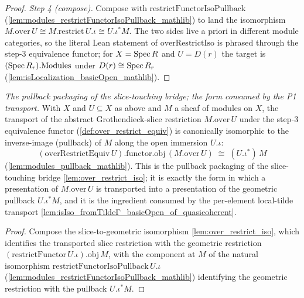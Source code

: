 \begin{proof}
  \emph{Step 4 (compose).} Compose with
  \(\mathrm{restrictFunctorIsoPullback}\) (\cref{lem:modules_restrictFunctorIsoPullback_mathlib})
  to land the isomorphism \(M.\mathrm{over}\,U \cong M.\mathrm{restrict}\,U.\iota \cong
  U.\iota^{*}M\). The two sides live a priori in different module categories, so the literal Lean
  statement of \(\mathrm{overRestrictIso}\) is phrased through the step-3 equivalence functor; for
  \(X = \operatorname{Spec} R\) and \(U = D(r)\) the target is \((\operatorname{Spec} R_r).\mathrm{Modules}\) under
  \(D(r) \cong \operatorname{Spec} R_r\) (\cref{lem:isLocalization_basicOpen_mathlib}).
\end{proof}


\begin{lemma}\leanok
  \label{lem:over_restrict_pullback_iso}
  \textit{The pullback packaging of the slice-touching bridge; the form consumed by the P1 transport.}
  With \(X\) and \(U \subseteq X\) as above and \(M\) a sheaf of modules on \(X\), the transport of the
  abstract Grothendieck-slice restriction \(M.\mathrm{over}\,U\) under the step-3 equivalence functor
  (\cref{def:over_restrict_equiv}) is canonically isomorphic to the inverse-image (pullback) of \(M\)
  along the open immersion \(U.\iota\):
  \[
    (\mathrm{overRestrictEquiv}\,U).\mathrm{functor}.\mathrm{obj}\,(M.\mathrm{over}\,U)
      \;\cong\; (U.\iota^{*})\,M
  \]
  (\cref{lem:modules_pullback_mathlib}). This is the pullback packaging of the slice-touching bridge
  \cref{lem:over_restrict_iso}; it is exactly the form in which a presentation of
  \(M.\mathrm{over}\,U\) is transported into a presentation of the geometric pullback \(U.\iota^{*}M\),
  and it is the ingredient consumed by the per-element local-tilde transport
  \cref{lem:isIso_fromTildeΓ_basicOpen_of_quasicoherent}.
\end{lemma}
\begin{proof}
  Compose the slice-to-geometric isomorphism \cref{lem:over_restrict_iso}, which identifies the
  transported slice restriction with the geometric restriction
  \((\mathrm{restrictFunctor}\,U.\iota).\mathrm{obj}\,M\), with the component at \(M\) of the natural
  isomorphism \(\mathrm{restrictFunctorIsoPullback}\,U.\iota\)
  (\cref{lem:modules_restrictFunctorIsoPullback_mathlib}) identifying the geometric restriction with
  the pullback \(U.\iota^{*}M\).
\end{proof}

